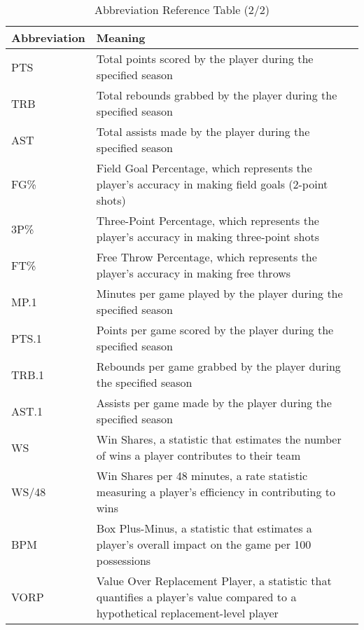 \documentclass[12pt]{article}
\begin{document}
    \begin{table}[htbp]
        \centering
        \caption{Abbreviation Reference Table (2/2)}
        \label{table:4}
        \vspace{5mm}
        \begin{tabular}{|l|p{10cm}|}
        \hline
        \rowcolor{gray!25} \textbf{Abbreviation} & \textbf{Meaning} \\
        \hline

        PTS & Total points scored by the player during the specified season \\
        \hline
        TRB & Total rebounds grabbed by the player during the specified season \\
        \hline
        AST & Total assists made by the player during the specified season \\
        \hline
        FG\% & Field Goal Percentage, which represents the player's accuracy in making field goals (2-point shots) \\
        \hline
        3P\% & Three-Point Percentage, which represents the player's accuracy in making three-point shots \\
        \hline
        FT\% & Free Throw Percentage, which represents the player's accuracy in making free throws \\
        \hline
        MP.1 & Minutes per game played by the player during the specified season \\
        \hline
        PTS.1 & Points per game scored by the player during the specified season \\
        \hline
        TRB.1 & Rebounds per game grabbed by the player during the specified season \\
        \hline
        AST.1 & Assists per game made by the player during the specified season \\
        \hline
        WS & Win Shares, a statistic that estimates the number of wins a player contributes to their team \\
        \hline
        WS/48 & Win Shares per 48 minutes, a rate statistic measuring a player's efficiency in contributing to wins \\
        \hline
        BPM & Box Plus-Minus, a statistic that estimates a player's overall impact on the game per 100 possessions \\
        \hline
        VORP & Value Over Replacement Player, a statistic that quantifies a player's value compared to a hypothetical replacement-level player \\

\end{tabular}
\end{table}
\end{document}
